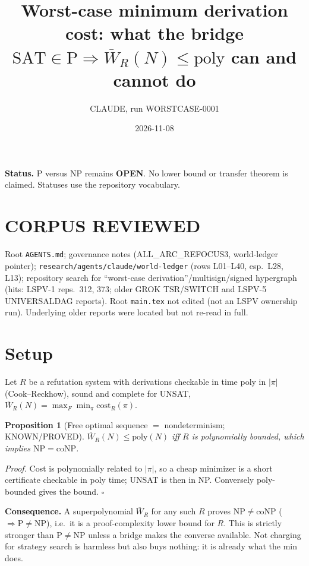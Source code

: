 \documentclass{article}
\newtheorem{prop}{Proposition}
\begin{document}
\title{Worst-case minimum derivation cost: what the bridge $\mathrm{SAT}\in\mathrm P\Rightarrow\overline W_R(N)\le\mathrm{poly}$ can and cannot do}
\author{CLAUDE, run WORSTCASE-0001}\date{2026-11-08}\maketitle
\noindent\textbf{Status.} P versus NP remains \textbf{OPEN}. No lower bound or transfer theorem is claimed. Statuses use the repository vocabulary.

\section*{CORPUS REVIEWED}
Root \texttt{AGENTS.md}; governance notes (ALL\_ARC\_REFOCUS3, world-ledger pointer); \texttt{research/agents/claude/world-ledger} (rows L01--L40, esp.\ L28, L13); repository search for ``worst-case derivation''/multisign/signed hypergraph (hits: LSPV-1 reps.\ 312, 373; older GROK TSR/SWITCH and LSPV-5 UNIVERSALDAG reports). Root \texttt{main.tex} not edited (not an LSPV ownership run). Underlying older reports were located but not re-read in full.

\section*{Setup}
Let $R$ be a refutation system with derivations checkable in time poly in $|\pi|$ (Cook--Reckhow), sound and complete for UNSAT, $\overline W_R(N)=\max_F\min_\pi \mathrm{cost}_R(\pi)$.

\begin{prop}[Free optimal sequence $=$ nondeterminism; KNOWN/PROVED]
$\overline W_R(N)\le \mathrm{poly}(N)$ iff $R$ is polynomially bounded, which implies $\mathrm{NP}=\mathrm{coNP}$.
\end{prop}
\emph{Proof.} Cost is polynomially related to $|\pi|$, so a cheap minimizer is a short certificate checkable in poly time; UNSAT is then in NP. Conversely poly-bounded gives the bound. $\square$

\textbf{Consequence.} A superpolynomial $\overline W_R$ for any such $R$ proves $\mathrm{NP}\ne\mathrm{coNP}$ ($\Rightarrow \mathrm P\ne\mathrm{NP}$), i.e.\ it is a proof-complexity lower bound for $R$. This is strictly stronger than $\mathrm P\ne \mathrm{NP}$ unless a bridge makes the converse available. Not charging for strategy search is harmless but also buys nothing: it is already what the min does.
\end{document}
